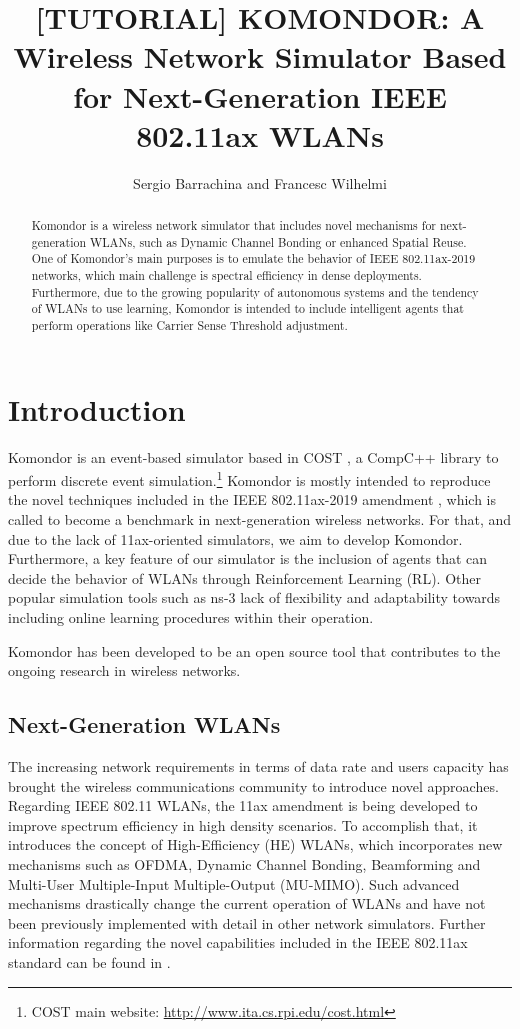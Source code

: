 \documentclass[a4paper]{article}
\title{[TUTORIAL] KOMONDOR: A Wireless Network Simulator Based for Next-Generation IEEE 802.11ax WLANs}
\author{Sergio Barrachina and Francesc Wilhelmi}
\begin{document}
\maketitle

\begin{abstract}
Komondor is a wireless network simulator that includes novel mechanisms for next-generation WLANs, such as Dynamic Channel Bonding or enhanced Spatial Reuse. One of Komondor's main purposes is to emulate the behavior of IEEE 802.11ax-2019 networks, which main challenge is spectral efficiency in dense deployments. Furthermore, due to the growing popularity of autonomous systems and the tendency of WLANs to use learning, Komondor is intended to include intelligent agents that perform operations like Carrier Sense Threshold adjustment.
\end{abstract}

\tableofcontents

\listoffigures

\listoftables

\section{Introduction}
\label{section:introduction}
	Komondor is an event-based simulator based in COST \cite{cost}, a CompC++ library to perform discrete event simulation.\footnote{COST main website: \url{http://www.ita.cs.rpi.edu/cost.html}} Komondor is mostly intended to reproduce the novel techniques included in the IEEE 802.11ax-2019 amendment \cite{tgax2017draft}, which is called to become a benchmark in next-generation wireless networks. For that, and due to the lack of 11ax-oriented simulators, we aim to develop Komondor. Furthermore, a key feature of our simulator is the inclusion of agents that can decide the behavior of WLANs through Reinforcement Learning (RL). Other popular simulation tools such as ns-3 lack of flexibility and adaptability towards including online learning procedures within their operation.
	
	Komondor has been developed to be an open source tool that contributes to the ongoing research in wireless networks.
	
	\subsection{Next-Generation WLANs}
	\label{section:ng_wlans}
	The increasing network requirements in terms of data rate and users capacity has brought the wireless communications community to introduce novel approaches. Regarding IEEE 802.11 WLANs, the 11ax amendment is being developed to improve spectrum efficiency in high density scenarios. To accomplish that, it introduces the concept of High-Efficiency (HE) WLANs, which incorporates new mechanisms such as OFDMA, Dynamic Channel Bonding, Beamforming and Multi-User Multiple-Input Multiple-Output (MU-MIMO). Such advanced mechanisms drastically change the current operation of WLANs and have not been previously implemented with detail in other network simulators. Further information regarding the novel capabilities included in the IEEE 802.11ax standard can be found in \cite{bellalta2016ieee}.
	
\end{document}

